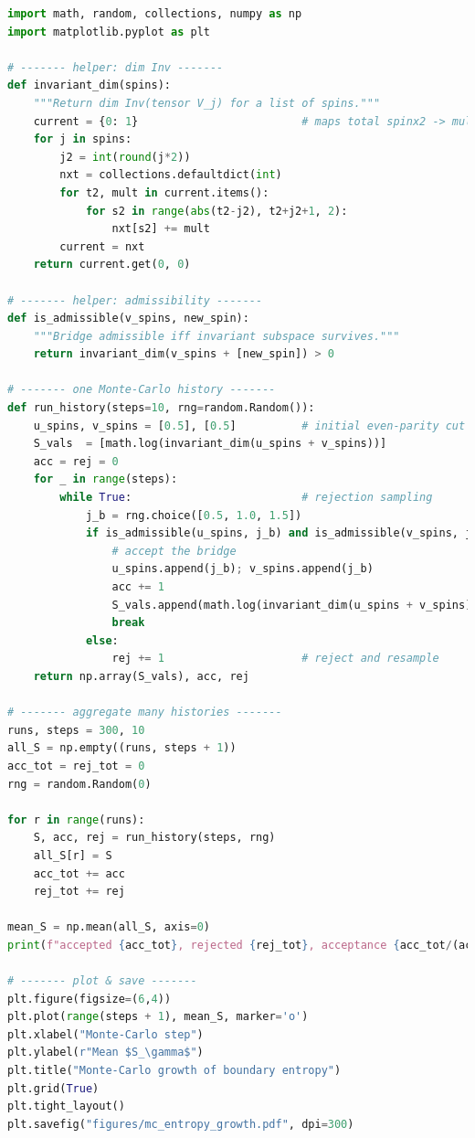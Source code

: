 \documentclass[11pt]{article}
\begin{document}
\begin{lstlisting}[language=Python,caption={Monte-Carlo entropy scan with admissibility filtering}]
import math, random, collections, numpy as np
import matplotlib.pyplot as plt

# ------- helper: dim Inv -------
def invariant_dim(spins):
    """Return dim Inv(tensor V_j) for a list of spins."""
    current = {0: 1}                         # maps total spinx2 -> mult
    for j in spins:
        j2 = int(round(j*2))
        nxt = collections.defaultdict(int)
        for t2, mult in current.items():
            for s2 in range(abs(t2-j2), t2+j2+1, 2):
                nxt[s2] += mult
        current = nxt
    return current.get(0, 0)

# ------- helper: admissibility -------
def is_admissible(v_spins, new_spin):
    """Bridge admissible iff invariant subspace survives."""
    return invariant_dim(v_spins + [new_spin]) > 0

# ------- one Monte-Carlo history -------
def run_history(steps=10, rng=random.Random()):
    u_spins, v_spins = [0.5], [0.5]          # initial even-parity cut
    S_vals  = [math.log(invariant_dim(u_spins + v_spins))]
    acc = rej = 0
    for _ in range(steps):
        while True:                          # rejection sampling
            j_b = rng.choice([0.5, 1.0, 1.5])
            if is_admissible(u_spins, j_b) and is_admissible(v_spins, j_b):
                # accept the bridge
                u_spins.append(j_b); v_spins.append(j_b)
                acc += 1
                S_vals.append(math.log(invariant_dim(u_spins + v_spins)))
                break
            else:
                rej += 1                     # reject and resample
    return np.array(S_vals), acc, rej

# ------- aggregate many histories -------
runs, steps = 300, 10
all_S = np.empty((runs, steps + 1))
acc_tot = rej_tot = 0
rng = random.Random(0)

for r in range(runs):
    S, acc, rej = run_history(steps, rng)
    all_S[r] = S
    acc_tot += acc
    rej_tot += rej

mean_S = np.mean(all_S, axis=0)
print(f"accepted {acc_tot}, rejected {rej_tot}, acceptance {acc_tot/(acc_tot+rej_tot):.3f}")

# ------- plot & save -------
plt.figure(figsize=(6,4))
plt.plot(range(steps + 1), mean_S, marker='o')
plt.xlabel("Monte-Carlo step")
plt.ylabel(r"Mean $S_\gamma$")
plt.title("Monte-Carlo growth of boundary entropy")
plt.grid(True)
plt.tight_layout()
plt.savefig("figures/mc_entropy_growth.pdf", dpi=300)
\end{lstlisting}
\end{document}
